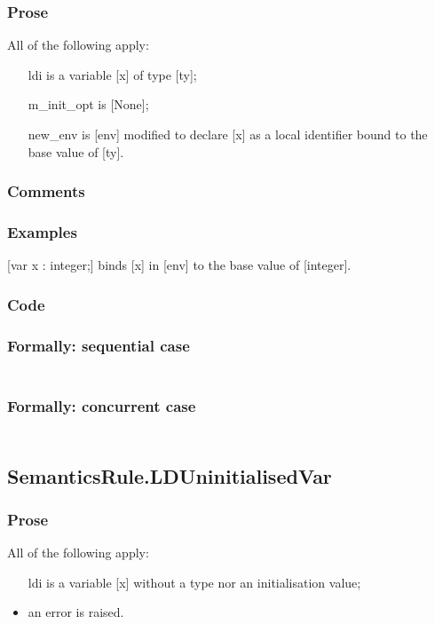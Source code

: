 \documentclass{book}
\begin{document}
    \subsubsection{Prose}
    All of the following apply:
    \begin{itemize}
    \item [ldi] is a variable [x] of type [ty];
    \item [m\_init\_opt] is [None];
    \item [new\_env] is [env] modified to declare [x] as a local identifier bound to
      the base value of [ty].
    \end{itemize}

    \subsubsection{Comments}

    \subsubsection{Examples}
    [var x : integer;] binds [x] in [env] to the base value of [integer].

  \subsubsection{Code}

  \subsubsection{Formally: sequential case}
  \begin{align}
  \end{align} 

  \subsubsection{Formally: concurrent case}
  \begin{align}
  \end{align} 

\subsection{SemanticsRule.LDUninitialisedVar \label{sec:SemanticsRule.LDUninitialisedVar}}

    \subsubsection{Prose}
    All of the following apply:
    \begin{itemize}
    \item [ldi] is a variable [x] without a type nor an initialisation value;
    \item an error is raised.
    \end{itemize}
\end{document}
